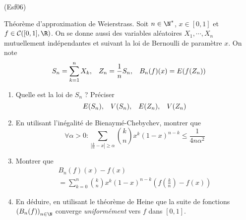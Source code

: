 \begin{tiny}(Esf06)\end{tiny} Théorème d'approximation de Weierstrass.\newline
Soit $n\in \N^*$, $x\in[0,1]$ et $f\in \mathcal{C}([0,1],\R)$.\newline
On se donne aussi des variables aléatoires $X_1,\cdots, X_n$ mutuellement indépendantes et suivant la loi de Bernoulli de paramètre $x$. On note
\begin{displaymath}
  S_n = \sum_{k=1}^n X_k,\hspace{0.3cm} Z_n = \frac{1}{n} S_n, \hspace{0.3cm}
  B_n(f)(x) = E(f(Z_n))
\end{displaymath}
\begin{enumerate}
  \item Quelle est la loi de $S_n$ ? Préciser
\begin{displaymath}
E(S_n),\hspace{0.3cm} V(S_n),\hspace{0.3cm} E(Z_n),\hspace{0.3cm} V(Z_n)
\end{displaymath}

  \item En utilisant l'inégalité de Bienaymé-Chebychev, montrer que 
\begin{displaymath}
\forall \alpha >0:
\sum_{\left|\frac{k}{n}-x\right|\geq \alpha} \binom{k}{n}x^k (1-x)^{n-k} 
\leq \frac{1}{4n\alpha^2}
\end{displaymath}
  \item Montrer que 
\begin{multline*}
B_n(f)(x)-f(x) \\ 
= \sum_{k=0}^{n} \binom{k}{n}x^k (1-x)^{n-k}\left(f(\frac{k}{n})-f(x) \right)  
\end{multline*}
  \item En déduire, en utilisant le théorème de Heine que la suite de fonctions $\left( B_n(f)\right)_{n\in \N}$ converge \emph{uniformément} vers $f$ dans $[0,1]$.
\end{enumerate}
